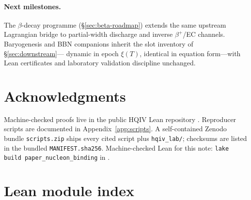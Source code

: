 \documentclass[11pt,notitlepage]{amsart}
\begin{document}
\paragraph{Next milestones.}
The $\beta$-decay programme (\S\ref{sec:beta-roadmap}) extends the same upstream
Lagrangian bridge to partial-width discharge and inverse $\beta^{+}$/EC channels.
Baryogenesis and BBN companions inherit the slot inventory of \S\ref{sec:downstream}---
dynamic in epoch $\xi(T)$, identical in equation form---with Lean certificates and
laboratory validation discipline unchanged.

\section*{Acknowledgments}

Machine-checked proofs live in the public HQIV Lean repository \cite{hqiv-lean}.
Reproducer scripts are documented in Appendix~\ref{app:scripts}.
A self-contained Zenodo bundle \texttt{scripts.zip} ships every
cited script plus \texttt{hqiv\_lab/}; checksums are listed in the bundled
\texttt{MANIFEST.sha256}.
Machine-checked Lean for this note: \texttt{lake build paper\_nucleon\_binding} in
\cite{hqiv-lean}.

\appendix

\section{Lean module index}
\label{app:lean-index}
\end{document}
